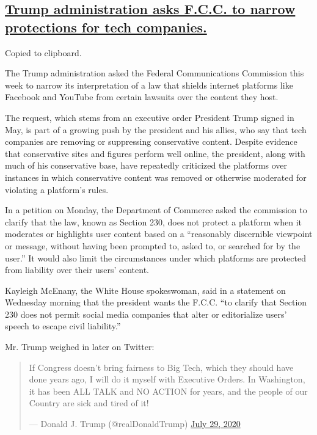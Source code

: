 \hypertarget{trump-administration-asks-fcc-to-narrow-protections-for-tech-companies}{%
\subsection{\texorpdfstring{\protect\hyperlink{trump-administration-asks-fcc-to-narrow-protections-for-tech-companies}{Trump
administration asks F.C.C. to narrow protections for tech
companies.}}{Trump administration asks F.C.C. to narrow protections for tech companies.}}\label{trump-administration-asks-fcc-to-narrow-protections-for-tech-companies}}

Copied to clipboard.

The Trump administration asked the Federal Communications Commission
this week to narrow its interpretation of a law that shields internet
platforms like Facebook and YouTube from certain lawsuits over the
content they host.

The request, which stems from an executive order President Trump signed
in May, is part of a growing push by the president and his allies, who
say that tech companies are removing or suppressing conservative
content. Despite evidence that conservative sites and figures perform
well online, the president, along with much of his conservative base,
have repeatedly criticized the platforms over instances in which
conservative content was removed or otherwise moderated for violating a
platform's rules.

In a petition on Monday, the Department of Commerce asked the commission
to clarify that the law, known as Section 230, does not protect a
platform when it moderates or highlights user content based on a
``reasonably discernible viewpoint or message, without having been
prompted to, asked to, or searched for by the user.'' It would also
limit the circumstances under which platforms are protected from
liability over their users' content.

Kayleigh McEnany, the White House spokeswoman, said in a statement on
Wednesday morning that the president wants the F.C.C. ``to clarify that
Section 230 does not permit social media companies that alter or
editorialize users' speech to escape civil liability.''

Mr. Trump weighed in later on Twitter:

\begin{quote}
If Congress doesn't bring fairness to Big Tech, which they should have
done years ago, I will do it myself with Executive Orders. In
Washington, it has been ALL TALK and NO ACTION for years, and the people
of our Country are sick and tired of it!

--- Donald J. Trump (@realDonaldTrump)
\href{https://twitter.com/realDonaldTrump/status/1288506554585505793?ref_src=twsrc\%5Etfw}{July
29, 2020}
\end{quote}

